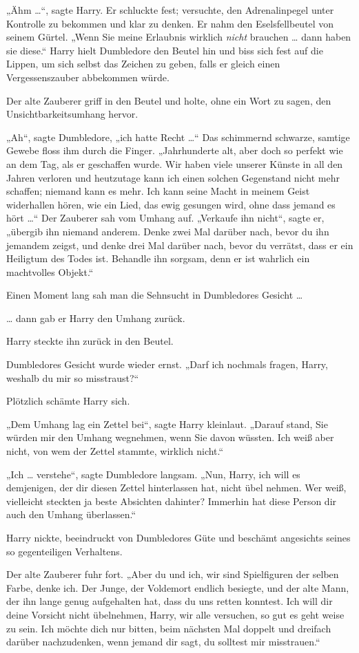 {„Ähm …“, sagte Harry. Er schluckte fest; versuchte, den Adrenalinpegel unter Kontrolle zu bekommen und klar zu denken. Er nahm den Eselsfellbeutel von seinem Gürtel. „Wenn Sie meine Erlaubnis wirklich \emph{nicht} brauchen … dann haben sie diese.“ Harry hielt Dumbledore den Beutel hin und biss sich fest auf die Lippen, um sich selbst das Zeichen zu geben, falls er gleich einen Vergessenszauber abbekommen würde.

Der alte Zauberer griff in den Beutel und holte, ohne ein Wort zu sagen, den Unsichtbarkeitsumhang hervor.

„Ah“, sagte Dumbledore, „ich hatte Recht …“ Das schimmernd schwarze, samtige Gewebe floss ihm durch die Finger. „Jahrhunderte alt, aber doch so perfekt wie an dem Tag, als er geschaffen wurde. Wir haben viele unserer Künste in all den Jahren verloren und heutzutage kann ich einen solchen Gegenstand nicht mehr schaffen; niemand kann es mehr. Ich kann seine Macht in meinem Geist widerhallen hören, wie ein Lied, das ewig gesungen wird, ohne dass jemand es hört …“ Der Zauberer sah vom Umhang auf. „Verkaufe ihn nicht“, sagte er, „übergib ihn niemand anderem. Denke zwei Mal darüber nach, bevor du ihn jemandem zeigst, und denke drei Mal darüber nach, bevor du verrätst, dass er ein Heiligtum des Todes ist. Behandle ihn sorgsam, denn er ist wahrlich ein machtvolles Objekt.“

Einen Moment lang sah man die Sehnsucht in Dumbledores Gesicht …

… dann gab er Harry den Umhang zurück.

Harry steckte ihn zurück in den Beutel.

Dumbledores Gesicht wurde wieder ernst. „Darf ich nochmals fragen, Harry, weshalb du mir so misstraust?“

Plötzlich schämte Harry sich.

„Dem Umhang lag ein Zettel bei“, sagte Harry kleinlaut. „Darauf stand, Sie würden mir den Umhang wegnehmen, wenn Sie davon wüssten. Ich weiß aber nicht, von wem der Zettel stammte, wirklich nicht.“

„Ich … verstehe“, sagte Dumbledore langsam. „Nun, Harry, ich will es demjenigen, der dir diesen Zettel hinterlassen hat, nicht übel nehmen. Wer weiß, vielleicht steckten ja beste Absichten dahinter? Immerhin hat diese Person dir auch den Umhang überlassen.“

Harry nickte, beeindruckt von Dumbledores Güte und beschämt angesichts seines so gegenteiligen Verhaltens.

Der alte Zauberer fuhr fort. „Aber du und ich, wir sind Spielfiguren der selben Farbe, denke ich. Der Junge, der Voldemort endlich besiegte, und der alte Mann, der ihn lange genug aufgehalten hat, dass du uns retten konntest. Ich will dir deine Vorsicht nicht übelnehmen, Harry, wir alle versuchen, so gut es geht weise zu sein. Ich möchte dich nur bitten, beim nächsten Mal doppelt und dreifach darüber nachzudenken, wenn jemand dir sagt, du solltest mir misstrauen.“

}
